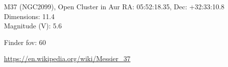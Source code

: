 \begin{block}{M37 (NGC2099), Open Cluster in Aur}
    RA: 05:52:18.35, Dec: +32:33:10.8 \\ 
    Dimensions: 11.4 \\ 
    Magnitude (V): 5.6



    Finder fov: 60 

    \url{https://en.wikipedia.org/wiki/Messier_37} 
\end{block}